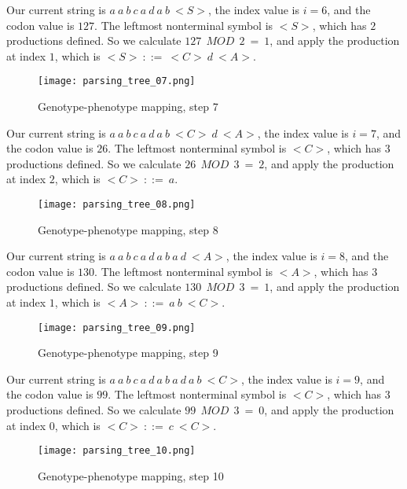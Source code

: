 \clearpage

Our current string is $a\:a\:b\:c\:a\:d\:a\:b\:{<}S{>}$, the index value is $i = 6$, and the codon value is $127$. The leftmost nonterminal symbol is ${<}S{>}$, which has $2$ productions defined. So we calculate $127\:\:MOD\:\:2\:=\:1$, and apply the production at index $1$, which is ${<}S{>}\:::=\:{<}C{>}\:d\:{<}A{>}$.

\begin{figure}[H]
	\centering
	\texttt{[image: parsing\_tree\_07.png]}
	\caption{Genotype-phenotype mapping, step 7}
\end{figure}

\clearpage

Our current string is $a\:a\:b\:c\:a\:d\:a\:b\:{<}C{>}\:d\:{<}A{>}$, the index value is $i = 7$, and the codon value is $26$. The leftmost nonterminal symbol is ${<}C{>}$, which has $3$ productions defined. So we calculate $26\:\:MOD\:\:3\:=\:2$, and apply the production at index $2$, which is ${<}C{>}\:::=\:a$.

\begin{figure}[H]
	\centering
	\texttt{[image: parsing\_tree\_08.png]}
	\caption{Genotype-phenotype mapping, step 8}
\end{figure}

\clearpage

Our current string is $a\:a\:b\:c\:a\:d\:a\:b\:a\:d\:{<}A{>}$, the index value is $i = 8$, and the codon value is $130$. The leftmost nonterminal symbol is ${<}A{>}$, which has $3$ productions defined. So we calculate $130\:\:MOD\:\:3\:=\:1$, and apply the production at index $1$, which is ${<}A{>}\:::=\:a\:b\:{<}C{>}$.

\begin{figure}[H]
	\centering
	\texttt{[image: parsing\_tree\_09.png]}
	\caption{Genotype-phenotype mapping, step 9}
\end{figure}

\clearpage

Our current string is $a\:a\:b\:c\:a\:d\:a\:b\:a\:d\:a\:b\:{<}C{>}$, the index value is $i = 9$, and the codon value is $99$. The leftmost nonterminal symbol is ${<}C{>}$, which has $3$ productions defined. So we calculate $99\:\:MOD\:\:3\:=\:0$, and apply the production at index $0$, which is ${<}C{>}\:::=\:c\:{<}C{>}$.

\begin{figure}[H]
	\centering
	\texttt{[image: parsing\_tree\_10.png]}
	\caption{Genotype-phenotype mapping, step 10}
\end{figure}

